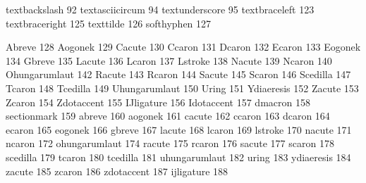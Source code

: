  textbackslash    92  
 textasciicircum  94 %
 textunderscore   95 
 textbraceleft   123 %
 textbraceright  125 %
 texttilde       126 
 softhyphen      127 %

 Abreve          128
 Aogonek         129
 Cacute          130
 Ccaron          131
 Dcaron          132
 Ecaron          133
 Eogonek         134
 Gbreve          135
 Lacute          136
 Lcaron          137
 Lstroke         138
 Nacute          139
 Ncaron          140
 Ohungarumlaut   142
 Racute          143
 Rcaron          144
 Sacute          145
 Scaron          146
 Scedilla        147
 Tcaron          148
 Tcedilla        149
 Uhungarumlaut   150
 Uring           151
 Ydiaeresis      152
 Zacute          153
 Zcaron          154
 Zdotaccent      155
 IJligature      156
 Idotaccent      157
 dmacron         158
 sectionmark     159  
 abreve          160
 aogonek         161
 cacute          162
 ccaron          163
 dcaron          164
 ecaron          165
 eogonek         166
 gbreve          167
 lacute          168
 lcaron          169
 lstroke         170
 nacute          171
 ncaron          172
 ohungarumlaut   174
 racute          175
 rcaron          176
 sacute          177
 scaron          178
 scedilla        179
 tcaron          180
 tcedilla        181
 uhungarumlaut   182
 uring           183
 ydiaeresis      184
 zacute          185
 zcaron          186
 zdotaccent      187
 ijligature      188
